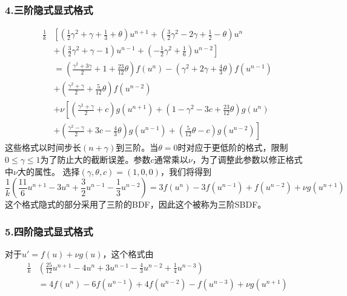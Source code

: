 \documentclass[12pt,a4paper]{article}
\begin{document}
\subsubsection{4.三阶隐式显式格式}
\begin{equation}
\begin{aligned}
\frac{1}{k}&\left[\left(\frac{1}{2}\gamma^2+\gamma+\frac{1}{3}+\theta\right)u^{n+1}+\left(\frac{3}{2}\gamma^2-2\gamma+\frac{1}{2}-\theta\right)u^n\right.\\
&\left.+\left(\frac{3}{2}\gamma^2+\gamma-1\right)u^{n-1}+\left(-\frac{1}{2}\gamma^2+\frac{1}{6}\right)u^{n-2}\right]\\
&=\left(\frac{\gamma^2+3\gamma}{2}+1+\frac{23}{12}\theta\right)f(u^n)-\left(\gamma^2+2\gamma+\frac{4}{3}\theta\right)f(u^{n-1})\\
&+\left(\frac{\gamma^2+\gamma}{2}+\frac{5}{12}\theta\right)f(u^{n-2})\\
&+\nu\left[\left(\frac{\gamma^2+\gamma}{2}+c\right)g(u^{n+1})+\left(1-\gamma^2-3c+\frac{23}{12}\theta\right)g(u^n)\right.\\
&\left.+\left(\frac{\gamma^2-\gamma}{2}+3c-\frac{4}{3}\theta\right)g(u^{n-1})+\left(\frac{5}{12}\theta-c\right)g(u^{n-2})\right]
\end{aligned}
\end{equation}
这些格式以时间步长$(n+\gamma)$到三阶。当$\theta=0$时对应于更低阶的格式，限制$0\le\gamma\le 1$为了防止大的截断误差。参数$c$通常乘以$\nu$，为了调整此参数以修正格式中$\nu$大的属性。
选择$(\gamma,\theta,c)=(1,0,0)$，我们将得到
\begin{equation}
\frac{1}{k}\left(\frac{11}{6}u^{n+1}-3u^n+\frac{3}{2}u^{n-1}-\frac{1}{3}u^{n-2}\right)=3f(u^n)-3f(u^{n-1})+f(u^{n-2})+\nu g(u^{n+1})
\end{equation}
这个格式隐式的部分采用了三阶的BDF，因此这个被称为三阶SBDF。
\subsubsection{5.四阶隐式显式格式}
对于$u'=f(u)+\nu g(u)$，这个格式由
\begin{equation}
\begin{aligned}
\frac{1}{k}&\left(\frac{25}{12}u^{n+1}-4u^n+3u^{n-1}-\frac{4}{3}u^{n-2}+\frac{1}{4}u^{n-3}\right)\\
&=4f(u^n)-6f(u^{n-1})+4f(u^{n-2})-f(u^{n-3})+\nu g(u^{n+1})
\end{aligned}
\end{equation}




\cite{tam19912d}

\end{document}
